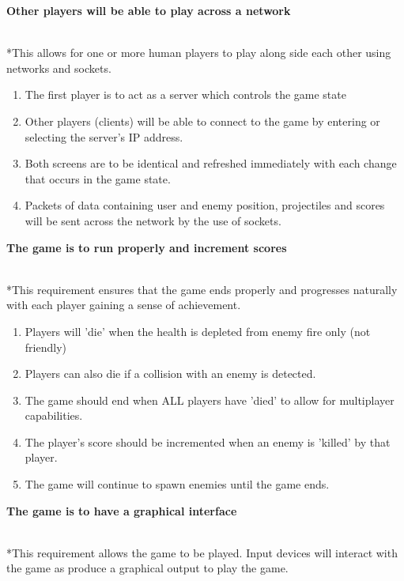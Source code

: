 \begin{enumerate}
\large{ \item \textbf{Other players will be able to play across a network}}
\\*This allows for one or more human players to play along side each other using networks and sockets.

\begin{enumerate}
\item The first player is to act as a server which controls the game state
\item Other players (clients) will be able to connect to the game by entering or selecting the server's IP address.
\item Both screens are to be identical and refreshed immediately with each change that occurs in the game state.
\item Packets of data containing user and enemy position, projectiles and scores will be sent across the network by the use of sockets.
\end{enumerate}

\large{ \item \textbf{The game is to run properly and increment scores}}
\\*This requirement ensures that the game ends properly and progresses naturally with each player gaining a sense of achievement.

\begin{enumerate}
\item Players will 'die' when the health is depleted from enemy fire only (not friendly)
\item Players can also die if a collision with an enemy is detected.
\item The game should end when ALL players have 'died' to allow for multiplayer capabilities.
\item The player's score should be incremented when an enemy is 'killed' by that player.
\item The game will continue to spawn enemies until the game ends.
\end{enumerate}

\large{ \item \textbf{The game is to have a graphical interface}}
\\*This requirement allows the game to be played. Input devices will interact with the game as produce a graphical output to play the game.


\end{enumerate}
